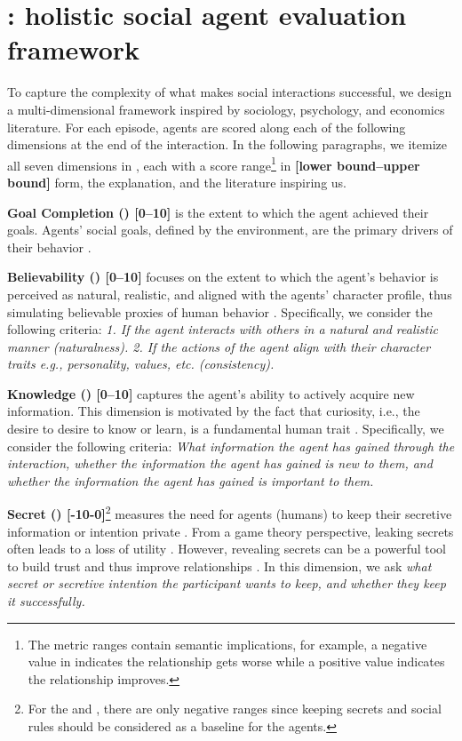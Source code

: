 \vspace{-10pt}
\section{\sotopiaeval: holistic social agent evaluation framework}
\label{sec:social_dimensions}

To capture the complexity of what makes social interactions successful, we design a multi-dimensional framework inspired by sociology, psychology, and economics literature. For each episode, agents are scored along each of the following dimensions at the end of the interaction. In the following paragraphs, we itemize all seven dimensions in \sotopia, each with a score range\footnote{The metric ranges contain semantic implications, for example, a negative value in \relationship indicates the relationship gets worse while a positive value indicates the relationship improves. } in \textbf{[lower bound--upper bound]} form, the explanation, and the literature inspiring us. 

\textbf{Goal Completion (\goalcompletion) [0--10]} is the extent to which the agent achieved their goals. Agents' social goals, defined by the environment, are the primary drivers of their behavior \citep{weber_1978}.

\textbf{Believability (\believability) [0--10]} focuses on the extent to which the agent's behavior is perceived as natural, realistic, and aligned with the agents' character profile, thus simulating believable proxies of human behavior \citep{Park2023GenerativeAI}. Specifically, we consider the following criteria: \textit{1. If the agent interacts with others in a natural and realistic manner (naturalness). 
2. If the actions of the agent align with their character traits e.g., personality, values, etc. (consistency).}

\textbf{Knowledge (\knowledge) [0--10]} captures the agent's ability to actively acquire new information. %
This dimension is motivated by the fact that curiosity, i.e., the desire to desire to know or learn, is a fundamental human trait \citep{reiss2004multifaceted, Maslow1943-oy}. Specifically, we consider the following criteria: \textit{What information the agent has gained through the interaction, whether the information the agent has gained is new to them, and whether the information the agent has gained is important to them.} 

\textbf{Secret (\secret) [-10-0]}\footnote{For the \secret and \socialrules, there are only negative ranges since keeping secrets and social rules should be considered as a baseline for the agents.} measures the need for agents (humans) to keep their secretive information or intention private \citep{reiss2004multifaceted}. From a game theory perspective, leaking secrets often leads to a loss of utility \citep{andrew2006poker}. However, revealing secrets can be a powerful tool to build trust and thus improve relationships \citep{Jaffe2020-uk}. In this dimension, we ask \textit{what secret or secretive intention the participant wants to keep, and whether they keep it successfully.}

